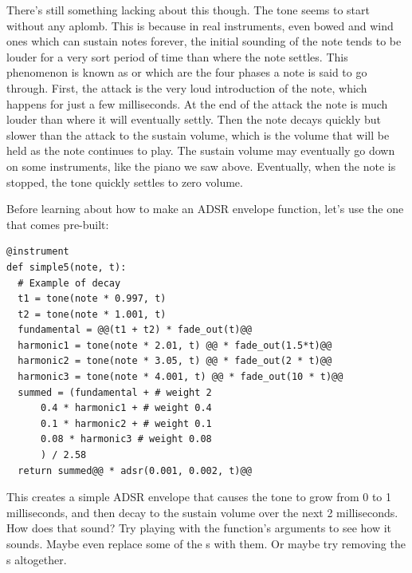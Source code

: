 There's still something lacking about this though. The tone seems to start without any aplomb. This
is because in real instruments, even bowed and wind ones which can sustain notes forever, the
initial sounding of the note tends to be louder for a very sort period of time than where the note
settles.
This phenomenon is known as  or  which are
the four phases a note is said to go through. First, the attack is the very loud introduction of the
note, which happens for just a few milliseconds. At the end of the attack the note is much louder
than where it will eventually settly. Then the note decays quickly but slower than the attack to the
sustain volume, which is the volume that will be held as the note continues to play. The sustain
volume may eventually go down on some instruments, like the piano we saw above. Eventually, when the
note is stopped, the tone quickly settles to zero volume.

Before learning about how to make an ADSR envelope function, let's use the one that comes pre-built:

\begin{TryThisBox}
\begin{lstlisting}
@instrument
def simple5(note, t):
  # Example of decay
  t1 = tone(note * 0.997, t)
  t2 = tone(note * 1.001, t)
  fundamental = @@(t1 + t2) * fade_out(t)@@
  harmonic1 = tone(note * 2.01, t) @@ * fade_out(1.5*t)@@
  harmonic2 = tone(note * 3.05, t) @@ * fade_out(2 * t)@@
  harmonic3 = tone(note * 4.001, t) @@ * fade_out(10 * t)@@
  summed = (fundamental + # weight 2
      0.4 * harmonic1 + # weight 0.4
      0.1 * harmonic2 + # weight 0.1
      0.08 * harmonic3 # weight 0.08
      ) / 2.58
  return summed@@ * adsr(0.001, 0.002, t)@@
\end{lstlisting}
\end{TryThisBox}

This creates a simple ADSR envelope that causes the tone to grow from 0 to 1 milliseconds, and then
decay to the sustain volume over the next 2 milliseconds. How does that sound? Try playing with
the  function's arguments to see how it sounds. Maybe even replace some of
the s with them. Or maybe try removing the s altogether.


